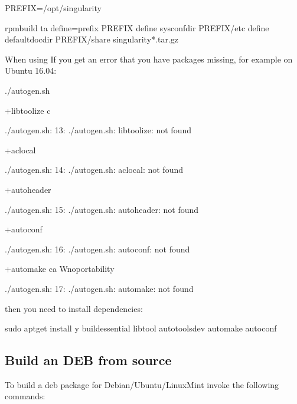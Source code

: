 \documentclass[letterpaper,10pt,english]{sphinxmanual}
\begin{document}
%
\begin{sphinxVerbatim}[commandchars=\\\{\}]
PREFIX=/opt/singularity

rpmbuild \PYGZhy{}ta \PYGZhy{}\PYGZhy{}define=\PYGZdq{}\PYGZus{}prefix \PYGZdl{}PREFIX\PYGZdq{} \PYGZhy{}\PYGZhy{}define \PYGZdq{}\PYGZus{}sysconfdir \PYGZdl{}PREFIX/etc\PYGZdq{} \PYGZhy{}\PYGZhy{}define \PYGZdq{}\PYGZus{}defaultdocdir \PYGZdl{}PREFIX/share\PYGZdq{} singularity\PYGZhy{}*.tar.gz
\end{sphinxVerbatim}

When using  If you get an error that you have packages missing, for example on Ubuntu 16.04:

%
\begin{sphinxVerbatim}[commandchars=\\\{\}]
./autogen.sh

+libtoolize \PYGZhy{}c

./autogen.sh: 13: ./autogen.sh: libtoolize: not found

+aclocal

./autogen.sh: 14: ./autogen.sh: aclocal: not found

+autoheader

./autogen.sh: 15: ./autogen.sh: autoheader: not found

+autoconf

./autogen.sh: 16: ./autogen.sh: autoconf: not found

+automake \PYGZhy{}ca \PYGZhy{}Wno\PYGZhy{}portability

./autogen.sh: 17: ./autogen.sh: automake: not found
\end{sphinxVerbatim}

then you need to install dependencies:

%
\begin{sphinxVerbatim}[commandchars=\\\{\}]
sudo apt\PYGZhy{}get install \PYGZhy{}y build\PYGZhy{}essential libtool autotools\PYGZhy{}dev automake autoconf
\end{sphinxVerbatim}


\subsection{Build an DEB from source}
\label{\detokenize{installation:build-an-deb-from-source}}
To build a deb package for Debian/Ubuntu/LinuxMint invoke the following commands:
\end{document}

